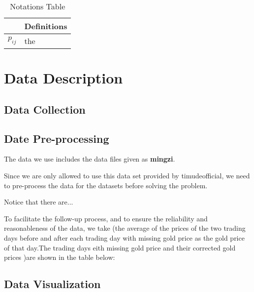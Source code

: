 \documentclass[12pt]{article}  %
\begin{document}
\begin{table}[H]%
	\centering
	\begin{tabular}{ll}
		\hline
		\rowcolor{green!30}
		\multicolumn{1}{c}{\textbf{Notations}} & \textbf{Definitions}\\ \hline
		$p_{ij}$                      & the \\
		                    
		\hline
	\end{tabular}
	\caption{Notations Table}
\end{table}















\section{Data Description}
\subsection{Data Collection}



\subsection{Date Pre-processing}
The data we use includes the data files given as \textbf{mingzi}.

Since we are only allowed to use this data set provided by timudeofficial, we need to pre-process the data for the datasets before solving the problem.

Notice that there are...

To facilitate the follow-up process, and to ensure the reliability and reasonableness of the data, we take (the average of the prices of the two trading days before and after each trading day with missing gold price as the gold price of that day.The trading days eith missing gold price and their corrected gold prices )are shown in the table below:



\subsection{Data Visualization}
\end{document}
